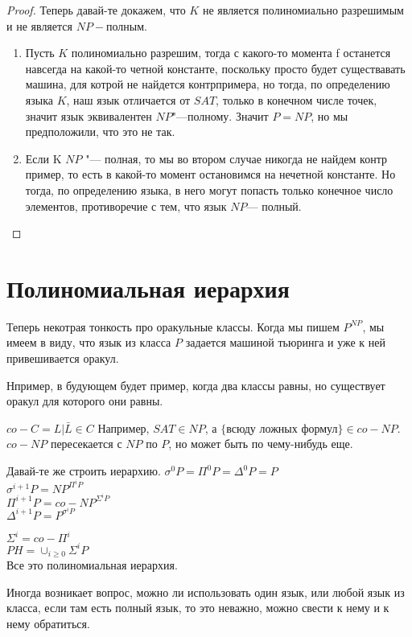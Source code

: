 \begin{proof}
Теперь давай-те докажем, что $K$  не является полиномиально разрешимым и 
не является $NP-$полным. 
\begin{enumerate}
\item Пусть $K$ полиномиально разрешим, тогда 
с какого-то момента f останется навсегда на какой-то 
четной константе, поскольку просто будет существавать 
машина, для котрой не найдется контрпримера, но тогда, 
по определению языка $K$, наш язык отличается от 
$SAT$, только в конечном числе точек, значит 
язык эквивалентен $NP$"---полному. Значит $P = NP$, 
но мы предположили, что это не так. 
\item 
Если K $NP$ "--- полная, то мы во втором 
случае никогда не найдем контр пример, то 
есть в какой-то момент остановимся на нечетной константе. 
Но тогда, по определению языка, в него могут попасть только конечное число 
элементов, противоречие с тем, что язык $NP$--- полный. 
\end{enumerate}
\end{proof}

\section{Полиномиальная иерархия}

Теперь некотрая тонкость про оракульные классы. Когда 
мы пишем $P^{NP}$, мы имеем в виду, что язык из класса 
$P$ задается машиной тьюринга и уже к ней привешивается оракул. 

Нпример, в будующем будет пример, когда два классы равны, но существует оракул
для которого они равны. 
 
$co-C = {L|\bar{L} \in C}$
Например, $SAT \in NP$, а $\{$всюду ложных формул$\} \in co-NP$.\\

$co-NP$ пересекается с $NP$ по $P$, но может быть по чему-нибудь еще. 

Давай-те же строить иерархию.
$\sigma^0P = \Pi^0P = \Delta^0P = P$\\
$\sigma^{i + 1}P = NP^{\Pi^iP}$\\
$\Pi^{i + 1}P = co-NP^{\Sigma^iP}$\\
$\Delta^{i + 1}P = P^{\sigma^iP}$

$\Sigma^{i} = co-\Pi^{i}$\\

$PH = \cup_{i \ge 0}\Sigma^{i}P$ \\

Все это полиномиальная иерархия. 

Иногда возникает вопрос, можно ли использовать один язык, или 
любой язык из класса, если там есть полный язык, то это неважно, 
можно свести к нему и к нему обратиться. 

